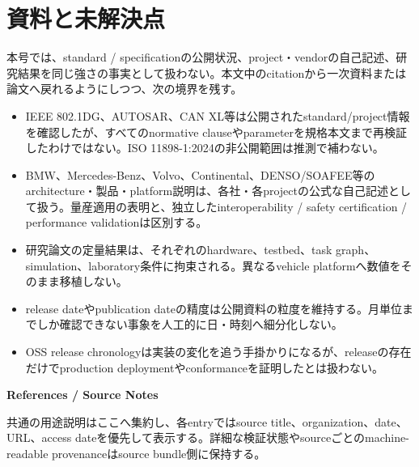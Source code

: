 \section{資料と未解決点}
\noindent 本号では、standard / specificationの公開状況、project・vendorの自己記述、研究結果を同じ強さの事実として扱わない。本文中のcitationから一次資料または論文へ戻れるようにしつつ、次の境界を残す。
\begin{itemize}
  \item IEEE 802.1DG、AUTOSAR、CAN XL等は公開されたstandard/project情報を確認したが、すべてのnormative clauseやparameterを規格本文まで再検証したわけではない。ISO 11898-1:2024の非公開範囲は推測で補わない。
  \item BMW、Mercedes-Benz、Volvo、Continental、DENSO/SOAFEE等のarchitecture・製品・platform説明は、各社・各projectの公式な自己記述として扱う。量産適用の表明と、独立したinteroperability / safety certification / performance validationは区別する。
  \item 研究論文の定量結果は、それぞれのhardware、testbed、task graph、simulation、laboratory条件に拘束される。異なるvehicle platformへ数値をそのまま移植しない。
  \item release dateやpublication dateの精度は公開資料の粒度を維持する。月単位までしか確認できない事象を人工的に日・時刻へ細分化しない。
  \item OSS release chronologyは実装の変化を追う手掛かりになるが、releaseの存在だけでproduction deploymentやconformanceを証明したとは扱わない。
\end{itemize}
\medskip
\noindent\textbf{References / Source Notes}\par
\smallskip
\noindent\small 共通の用途説明はここへ集約し、各entryではsource title、organization、date、URL、access dateを優先して表示する。詳細な検証状態やsourceごとのmachine-readable provenanceはsource bundle側に保持する。\normalsize
\printbibliography[heading=none]
